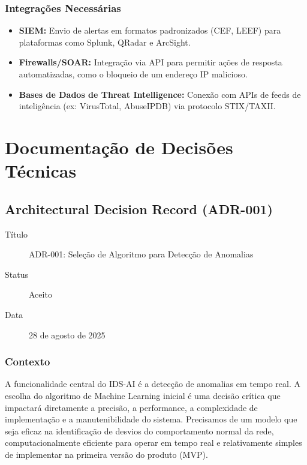 \documentclass[a4paper,12pt]{article}
\begin{document}
\subsubsection{Integrações Necessárias}
\begin{itemize}
    \item \textbf{SIEM:} Envio de alertas em formatos padronizados (CEF, LEEF) para plataformas como Splunk, QRadar e ArcSight.
    \item \textbf{Firewalls/SOAR:} Integração via API para permitir ações de resposta automatizadas, como o bloqueio de um endereço IP malicioso.
    \item \textbf{Bases de Dados de Threat Intelligence:} Conexão com APIs de feeds de inteligência (ex: VirusTotal, AbuseIPDB) via protocolo STIX/TAXII.
\end{itemize}

\newpage

\section{Documentação de Decisões Técnicas}

\subsection{Architectural Decision Record (ADR-001)}

\begin{description}
    \item[Título] ADR-001: Seleção de Algoritmo para Detecção de Anomalias
    \item[Status] Aceito
    \item[Data] 28 de agosto de 2025
\end{description}

\subsubsection{Contexto}
A funcionalidade central do IDS-AI é a detecção de anomalias em tempo real. A escolha do algoritmo de Machine Learning inicial é uma decisão crítica que impactará diretamente a precisão, a performance, a complexidade de implementação e a manutenibilidade do sistema. Precisamos de um modelo que seja eficaz na identificação de desvios do comportamento normal da rede, computacionalmente eficiente para operar em tempo real e relativamente simples de implementar na primeira versão do produto (MVP).
\end{document}
